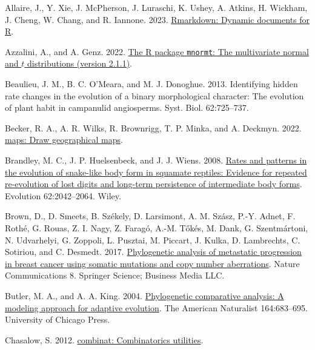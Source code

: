 \documentclass[fleqn,10pt,lineno]{wlpeerj} %
\newlength{\cslhangindent}
\newenvironment{CSLReferences}[2] %
 {\begin{list}{}{%
  \setlength{\itemindent}{0pt}
  \setlength{\leftmargin}{0pt}
  \setlength{\parsep}{0pt}
  \ifodd #1
   \setlength{\leftmargin}{\cslhangindent}
   \setlength{\itemindent}{-1\cslhangindent}
  \fi
  \setlength{\itemsep}{#2\baselineskip}}}
 {\end{list}}
\begin{document}
\label{refs}
\begin{CSLReferences}{1}{0}
Allaire, J., Y. Xie, J. McPherson, J. Luraschi, K. Ushey, A. Atkins, H. Wickham, J. Cheng, W. Chang, and R. Iannone. 2023. \href{https://github.com/rstudio/rmarkdown}{{R}markdown: Dynamic documents for {R}}.

Azzalini, A., and A. Genz. 2022. \href{http://azzalini.stat.unipd.it/SW/Pkg-mnormt/}{The {R} package \texttt{mnormt}: The multivariate normal and \(t\) distributions (version 2.1.1)}.

Beaulieu, J. M., B. C. O'Meara, and M. J. Donoghue. 2013. Identifying hidden rate changes in the evolution of a binary morphological character: The evolution of plant habit in campanulid angiosperms. Syst. Biol. 62:725--737.

Becker, R. A., A. R. Wilks, R. Brownrigg, T. P. Minka, and A. Deckmyn. 2022. \href{https://CRAN.R-project.org/package=maps}{{maps}: Draw geographical maps}.

Brandley, M. C., J. P. Huelsenbeck, and J. J. Wiens. 2008. \href{https://doi.org/10.1111/j.1558-5646.2008.00430.x}{Rates and patterns in the evolution of snake-like body form in squamate reptiles: Evidence for repeated re-evolution of lost digits and long-term persistence of intermediate body forms}. Evolution 62:2042--2064. Wiley.

Brown, D., D. Smeets, B. Székely, D. Larsimont, A. M. Szász, P.-Y. Adnet, F. Rothé, G. Rouas, Z. I. Nagy, Z. Faragó, A.-M. Tőkés, M. Dank, G. Szentmártoni, N. Udvarhelyi, G. Zoppoli, L. Pusztai, M. Piccart, J. Kulka, D. Lambrechts, C. Sotiriou, and C. Desmedt. 2017. \href{https://doi.org/10.1038/ncomms14944}{Phylogenetic analysis of metastatic progression in breast cancer using somatic mutations and copy number aberrations}. Nature Communications 8. Springer Science; Business Media LLC.

Butler, M. A., and A. A. King. 2004. \href{https://doi.org/10.1086/426002}{Phylogenetic comparative analysis: A modeling approach for adaptive evolution}. The American Naturalist 164:683--695. University of Chicago Press.

Chasalow, S. 2012. \href{https://CRAN.R-project.org/package=combinat}{{combinat}: Combinatorics utilities}.


\end{CSLReferences}
\end{document}
